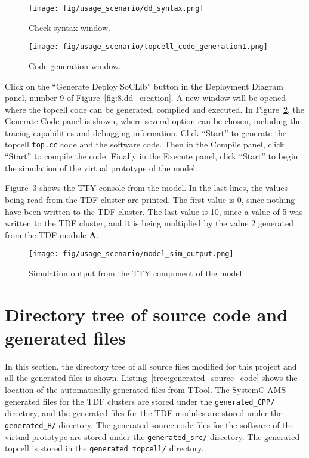 \begin{figure}[h]
         \centering
         \texttt{[image: fig/usage\_scenario/dd\_syntax.png]}
         \caption{Check syntax window.}
         \label{fig:8.dd_syntax}
\end{figure}

\begin{figure}[H]
         \centering
         \texttt{[image: fig/usage\_scenario/topcell\_code\_generation1.png]}
         \caption{Code generation window.}
         \label{fig:8.topcell_code_generation1}
\end{figure}

Click on the ``Generate Deploy SoCLib'' button in the Deployment Diagram panel, number 9 of Figure~\ref{fig:8.dd_creation}. A new window will be opened where the topcell code can be generated, compiled and executed. In Figure~\ref{fig:8.topcell_code_generation1}, the Generate Code panel is shown, where several option can be chosen, including the tracing capabilities and debugging information. Click ``Start'' to generate the topcell \texttt{top.cc} code and the software code. Then in the Compile panel, click ``Start'' to compile the code. Finally in the Execute panel, click ``Start'' to begin the simulation of the virtual prototype of the model.

Figure~\ref{fig:8.model_sim_output} shows the TTY console from the model. In the last lines, the values being read from the TDF cluster are printed. The first value is 0, since nothing have been written to the TDF cluster. The last value is 10, since a value of 5 was written to the TDF cluster, and it is being multiplied by the value 2 generated from the TDF module \textbf{A}.
\begin{figure}[H]
         \centering
         \texttt{[image: fig/usage\_scenario/model\_sim\_output.png]}
         \caption{Simulation output from the TTY component of the model.}
         \label{fig:8.model_sim_output}
\end{figure}



\newpage
\clearpage
\section{Directory tree of source code and generated files}
\label{sec:appendix-dir-tree}

In this section, the directory tree of all source files modified for this project and all the generated files is shown. Listing~\ref{tree:generated_source_code} shows the location of the automatically generated files from TTool. The SystemC-AMS generated files for the TDF clusters are stored under the \texttt{generated\_CPP/} directory, and the generated files for the TDF modules are stored under the \texttt{generated\_H/} directory. The generated source code files for the software of the virtual prototype are stored under the \texttt{generated\_src/} directory. The generated topcell is stored in the \texttt{generated\_topcell/} directory.

